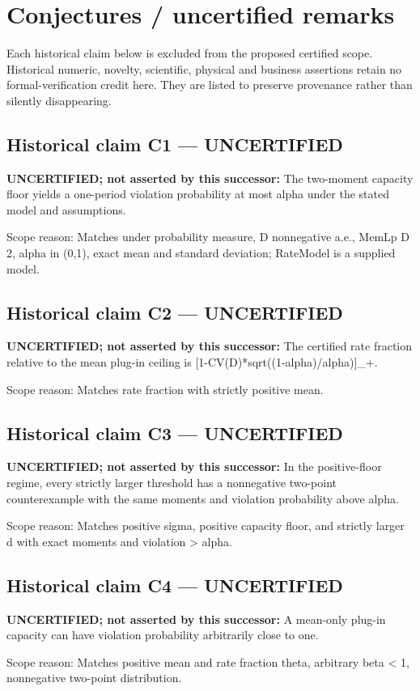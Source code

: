 \documentclass[11pt]{article}
\begin{document}
\section*{Conjectures / uncertified remarks}
Each historical claim below is excluded from the proposed certified scope. Historical numeric, novelty, scientific, physical and business assertions retain no formal-verification credit here. They are listed to preserve provenance rather than silently disappearing.
\subsection*{Historical claim C1 --- UNCERTIFIED}
\textbf{UNCERTIFIED; not asserted by this successor:} The two-moment capacity floor yields a one-period violation probability at most alpha under the stated model and assumptions.
\par Scope reason: Matches under probability measure, D nonnegative a.e., MemLp D 2, alpha in (0,1), exact mean and standard deviation; RateModel is a supplied model.
\subsection*{Historical claim C2 --- UNCERTIFIED}
\textbf{UNCERTIFIED; not asserted by this successor:} The certified rate fraction relative to the mean plug-in ceiling is [1-CV(D)*sqrt((1-alpha)/alpha)]\_\allowbreak{}+.
\par Scope reason: Matches rate fraction with strictly positive mean.
\subsection*{Historical claim C3 --- UNCERTIFIED}
\textbf{UNCERTIFIED; not asserted by this successor:} In the positive-floor regime, every strictly larger threshold has a nonnegative two-point counterexample with the same moments and violation probability above alpha.
\par Scope reason: Matches positive sigma, positive capacity floor, and strictly larger d with exact moments and violation > alpha.
\subsection*{Historical claim C4 --- UNCERTIFIED}
\textbf{UNCERTIFIED; not asserted by this successor:} A mean-only plug-in capacity can have violation probability arbitrarily close to one.
\par Scope reason: Matches positive mean and rate fraction theta, arbitrary beta < 1, nonnegative two-point distribution.
\end{document}
